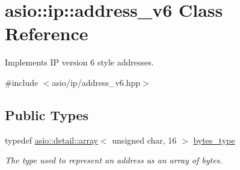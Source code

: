 \hypertarget{classasio_1_1ip_1_1address__v6}{}\section{asio\+:\+:ip\+:\+:address\+\_\+v6 Class Reference}
\label{classasio_1_1ip_1_1address__v6}


Implements I\+P version 6 style addresses.  




{\ttfamily \#include $<$asio/ip/address\+\_\+v6.\+hpp$>$}

\subsection*{Public Types}
\begin{DoxyCompactItemize}
\item 
typedef \hyperlink{classboost_1_1array}{asio\+::detail\+::array}$<$ unsigned char, 16 $>$ \hyperlink{classasio_1_1ip_1_1address__v6_a8a3e5d2312af4134087ad3ebdaad7881}{bytes\+\_\+type}
\begin{DoxyCompactList}\small\item\em The type used to represent an address as an array of bytes. \end{DoxyCompactList}\end{DoxyCompactItemize}
